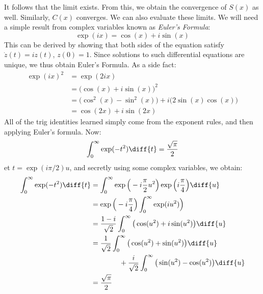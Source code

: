 \documentclass[crop=false,class=book,oneside]{standalone}
\begin{document}
            It follows that the limit exists. From this, we obtain
            the convergence of $S(x)$ as well. Similarly, $C(x)$
            converges. We can also evaluate these limits. We will
            need a simple result from complex variables known as
            \textit{Euler's Formula}:
            \begin{equation}
                \exp(ix)=\cos(x)+i\sin(x)
            \end{equation}
            This can be derived by showing that both sides of the
            equation satisfy $\dot{z}(t)=iz(t)$, $z(0)=1$. Since
            solutions to such differential equations are unique,
            we thus obtain Euler's Formula. As a side fact:
            \begin{align}
                \exp(ix)^{2}&=\exp(2ix)\\
                &=\big(\cos(x)+i\sin(x)\big)^{2}\\
                &=\big(\cos^{2}(x)-\sin^{2}(x)\big)+
                i\big(2\sin(x)\cos(x)\big)\\
                &=\cos(2x)+i\sin(2x)
            \end{align}
            All of the trig identities learned simply come from
            the exponent rules, and then applying Euler's formula.
            Now:
            \begin{equation}
                \int_{0}^{\infty}\exp(-t^{2})\diff{t}
                =\frac{\sqrt{\pi}}{2}
            \end{equation}
            et $t=\exp(i\pi/2)u$, and secretly using some complex
            variables, we obtain:
            \begin{align}
                \int_{0}^{\infty}\exp(-t^{2})\diff{t}
                &=\int_{0}^{\infty}
                \exp\Big(-i\frac{\pi}{2}u^{2}\Big)
                \exp\Big(i\frac{\pi}{4}\Big)\diff{u}\\
                &=\exp\Big(-i\frac{\pi}{4}\Big)
                \int_{0}^{\infty}\exp(iu^{2})\Big)\\
                &=\frac{1-i}{\sqrt{2}}\int_{0}^{\infty}
                \big(\cos(u^{2})+i\sin(u^{2})\big)\diff{u}\\
                \nonumber&=\frac{1}{\sqrt{2}}\int_{0}^{\infty}
                    \big(\cos(u^{2})+\sin(u^{2})\big)\diff{u}\\
                &\quad\quad\quad\quad
                    +\frac{i}{\sqrt{2}}\int_{0}^{\infty}
                \big(\sin(u^{2})-\cos(u^{2})\big)\diff{u}\\
                &=\frac{\sqrt{\pi}}{2}
            \end{align}
\end{document}
